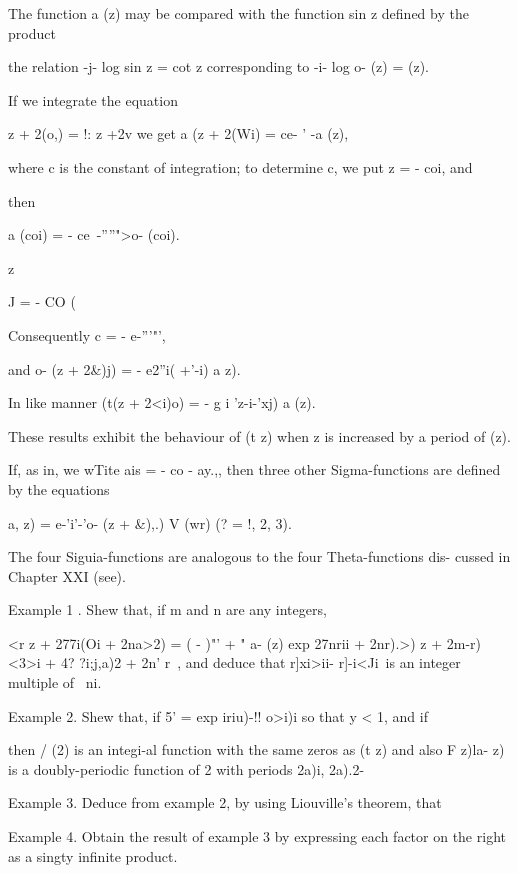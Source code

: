 {The function a (z) may be compared with the function sin z defined by
the product

the relation -j- log sin z = cot z corresponding to -i- log o- (z) =
(z).


If we integrate the equation

  z + 2(o,) = !: z +2v we get a (z + 2(Wi) = ce- ' -a (z),

where c is the constant of integration; to determine c, we put z = -
coi, and

then

a (coi) = - ce~-''''">o- (coi).

z

J = - CO (\

%
%

Consequently c = - e-'''"',

and o- (z + 2\&)j) = - e2''i( +'-i) a z).

In like manner (t(z + 2<i)o) = - g i 'z-i-'xj) a (z).

These results exhibit the behaviour of (t z) when z is increased by a
period of (z).

If, as in, we wTite ais = - co - ay.,, then three other
Sigma-functions are defined by the equations

a, z) = e-'i'-'o- (z + \&),.) V (wr) (? = !, 2, 3).

The four Siguia-functions are analogous to the four Theta-functions
dis- cussed in Chapter XXI (see).

Example 1 . Shew that, if m and n are any integers,

<r z + 277i(Oi + 2na>2) = ( - )"' + " a- (z) exp 27nrii + 2nr).>) z +
2m-r) <3>i + 4? ?i;j,a)2 + 2n' r\ < ia>, and deduce that r]xi>ii-
r]-i<Ji\ is an integer multiple of \ ni.

Example 2. Shew that, if 5' = exp iriu)-!! o>i)i so that y < 1, and if

then / (2) is an integi-al function with the same zeros as (t z) and
also F z)la- z) is a doubly-periodic function of 2 with periods 2a)i,
2a).2-

Example 3. Deduce from example 2, by using Liouville's theorem, that

Example 4. Obtain the result of example 3 by expressing each factor on
the right as a singty infinite product.


}
